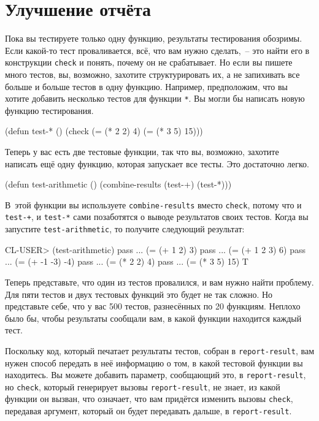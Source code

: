 \section{Улучшение отчёта}

Пока вы тестируете только одну функцию, результаты тестирования обозримы. Если какой-то
тест проваливается, всё, что вам нужно сделать,~-- это найти его в конструкции \lstinline{check}
и понять, почему он не срабатывает. Но если вы пишете много тестов, вы, возможно, захотите
структурировать их, а не запихивать все больше и больше тестов в одну функцию. Например,
предположим, что вы хотите добавить несколько тестов для функции \lstinline{*}. Вы могли бы
написать новую функцию тестирования.

\begin{myverb}
(defun test-* ()
  (check
    (= (* 2 2) 4)
    (= (* 3 5) 15)))
\end{myverb}

Теперь у вас есть две тестовые функции, так что вы, возможно, захотите написать ещё одну
функцию, которая запускает все тесты. Это достаточно легко.

\begin{myverb}
(defun test-arithmetic ()
  (combine-results
   (test-+)
   (test-*)))
\end{myverb}

В~этой функции вы используете \lstinline{combine-results} вместо \lstinline{check}, потому что и
\lstinline{test-+}, и \lstinline{test-*} сами позаботятся о выводе результатов своих тестов. Когда
вы запустите \lstinline{test-arithmetic}, то получите следующий результат:

\begin{myverb}
CL-USER> (test-arithmetic)
pass ... (= (+ 1 2) 3)
pass ... (= (+ 1 2 3) 6)
pass ... (= (+ -1 -3) -4)
pass ... (= (* 2 2) 4)
pass ... (= (* 3 5) 15)
T
\end{myverb}

Теперь представьте, что один из тестов провалился, и вам нужно найти проблему. Для пяти
тестов и двух тестовых функций это будет не так сложно. Но представьте себе, что у вас 500
тестов, разнесённых по 20 функциям. Неплохо было бы, чтобы результаты сообщали вам, в
какой функции находится каждый тест.

Поскольку код, который печатает результаты тестов, собран в \lstinline{report-result}, вам
нужен способ передать в неё информацию о том, в какой тестовой функции вы находитесь. Вы
можете добавить параметр, сообщающий это, в \lstinline{report-result}, но \lstinline{check}, который
генерирует вызовы \lstinline{report-result}, не знает, из какой функции он вызван, что
означает, что вам придётся изменить вызовы \lstinline{check}, передавая аргумент, который он
будет передавать дальше, в \lstinline{report-result}.

